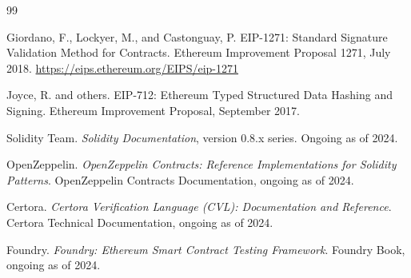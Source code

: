 \documentclass[11pt,a4paper]{article}
\theoremstyle{definition}
\theoremstyle{remark}
\begin{document}
\begin{thebibliography}{99}

Giordano, F., Lockyer, M., and Castonguay, P.
\newblock EIP-1271: Standard Signature Validation Method for
  Contracts.
\newblock Ethereum Improvement Proposal 1271, July 2018.
\newblock \url{https://eips.ethereum.org/EIPS/eip-1271}

Joyce, R. and others.
\newblock EIP-712: Ethereum Typed Structured Data Hashing and
  Signing.
\newblock Ethereum Improvement Proposal, September 2017.

Solidity Team.
\newblock \emph{Solidity Documentation}, version 0.8.x series.
\newblock Ongoing as of 2024.

OpenZeppelin.
\newblock \emph{OpenZeppelin Contracts: Reference Implementations
  for Solidity Patterns}.
\newblock OpenZeppelin Contracts Documentation, ongoing as of 2024.

Certora.
\newblock \emph{Certora Verification Language (CVL): Documentation
  and Reference}.
\newblock Certora Technical Documentation, ongoing as of 2024.

Foundry.
\newblock \emph{Foundry: Ethereum Smart Contract Testing Framework}.
\newblock Foundry Book, ongoing as of 2024.

\end{thebibliography}
\end{document}
